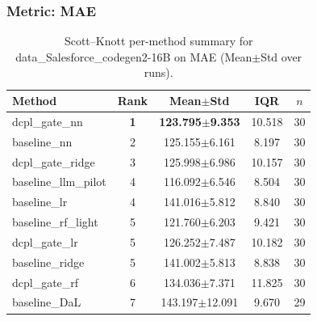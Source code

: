 \subsubsection*{Metric: MAE}
\begin{table}[H]
\centering
\scriptsize
\setlength{\tabcolsep}{4pt}
\renewcommand{\arraystretch}{1.1}
\caption{Scott--Knott per-method summary for data\_Salesforce\_codegen2-16B on MAE (Mean$\pm$Std over runs).}
\label{tab:sk_data_Salesforce_codegen2-16B_MAE}
\begin{tabular}{l|c|c|c|c}
\hline
\textbf{Method} & \textbf{Rank} & \textbf{Mean$\pm$Std} & \textbf{IQR} & \textbf{$n$} \\
\hline
\rowcolor{red!15} dcpl\_gate\_nn & \textbf{1} & \textbf{123.795$\pm$9.353} & 10.518 & 30 \\
baseline\_nn & 2 & 125.155$\pm$6.161 & 8.197 & 30 \\
dcpl\_gate\_ridge & 3 & 125.998$\pm$6.986 & 10.157 & 30 \\
baseline\_llm\_pilot & 4 & 116.092$\pm$6.546 & 8.504 & 30 \\
baseline\_lr & 4 & 141.016$\pm$5.812 & 8.840 & 30 \\
baseline\_rf\_light & 5 & 121.760$\pm$6.203 & 9.421 & 30 \\
dcpl\_gate\_lr & 5 & 126.252$\pm$7.487 & 10.182 & 30 \\
baseline\_ridge & 5 & 141.002$\pm$5.813 & 8.838 & 30 \\
dcpl\_gate\_rf & 6 & 134.036$\pm$7.371 & 11.825 & 30 \\
baseline\_DaL & 7 & 143.197$\pm$12.091 & 9.670 & 29 \\
\hline
\end{tabular}
\end{table}

